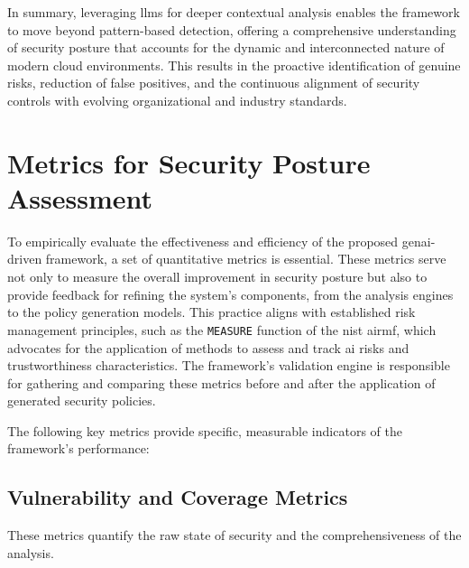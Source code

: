 In summary, leveraging \glspl{llm} for deeper contextual analysis enables the framework to move beyond pattern-based detection, offering a comprehensive understanding of security posture that accounts for the dynamic and interconnected nature of modern cloud environments\cite{li_iris_2025, andrade_enhancing_2025-1}. This results in the proactive identification of genuine risks, reduction of false positives, and the continuous alignment of security controls with evolving organizational and industry standards.


\section{Metrics for Security Posture Assessment} %
\label{sec:Metrics for Security Posture Assessment}

To empirically evaluate the effectiveness and efficiency of the proposed \gls{genai}-driven framework, a set of quantitative metrics is essential. These metrics serve not only to measure the overall improvement in security posture but also to provide feedback for refining the system's components, from the analysis engines to the policy generation models. This practice aligns with established risk management principles, such as the \texttt{MEASURE} function of the \gls{nist} \gls{airmf}, which advocates for the application of methods to assess and track \gls{ai} risks and trustworthiness characteristics. The framework's validation engine is responsible for gathering and comparing these metrics before and after the application of generated security policies.

The following key metrics provide specific, measurable indicators of the framework's performance:

\subsection*{Vulnerability and Coverage Metrics}
These metrics quantify the raw state of security and the comprehensiveness of the analysis.

